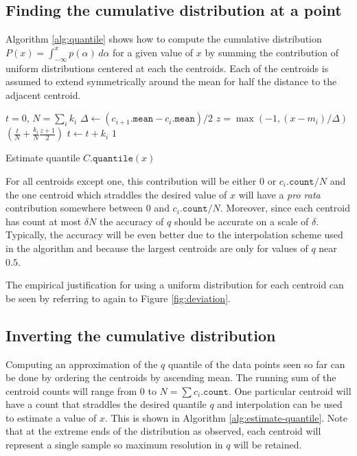 \documentclass[11pt]{amsart}
\begin{document}
\subsection{Finding the cumulative distribution at a point}
Algorithm \ref{alg:quantile} shows how to compute the cumulative distribution $P(x)=\int_{-\infty}^x p(\alpha) \, d\alpha$ for a given value of $x$ by summing the contribution of uniform distributions centered at each the centroids.  Each of the centroids is assumed to extend symmetrically around the mean for half the distance to the adjacent centroid.

 \begin{algorithm}[b]
 \label{alg:quantile}
\SetNoFillComment
{}
$t = 0$, $N = \sum_i k_i$\;
 {
     {
      $\Delta \gets (c_{i+1}.\mathtt{mean} - c_i.\mathtt{mean})/2$\;
    } 
    $z = \max(-1, (x-m_i)/\Delta)$\;
   {
    \Return $( \frac{t}{N} + \frac{k_i} N \frac{z+1} {2})$
  }
  $t \gets t + k_i$\;
}
\Return $1$
\caption{Estimate quantile $C.\mathtt{quantile}(x)$}
\end{algorithm}

For all centroids except one, this contribution will be either $0$ or $c_i.\mathtt{count}/N$ and the one centroid which straddles the desired value of $x$ will have a {\em pro rata} contribution somewhere between $0$ and $c_i.\mathtt{count}/N$. Moreover, since each centroid has count at most $\delta N$ the accuracy of $q$ should be accurate on a scale of $\delta$.  Typically, the accuracy will be even better due to the interpolation scheme used in the algorithm and because the largest centroids are only for values of $q$ near $0.5$.

The empirical justification for using a uniform distribution for each centroid can be seen by referring to again to Figure \ref{fig:deviation}.  

\subsection{Inverting the cumulative distribution}
Computing an approximation of the $q$ quantile of the data points seen so far can be done by ordering the centroids by ascending mean.  The running sum of the centroid counts will range from $0$ to $N=\sum c_i.\mathtt{count}$.  One particular centroid will have a count that straddles the desired quantile $q$ and interpolation can be used to estimate a value of $x$.  This is shown in Algorithm \ref{alg:estimate-quantile}.   Note that at the extreme ends of the distribution as observed, each centroid will represent a single sample so maximum resolution in $q$ will be retained.
\end{document}
